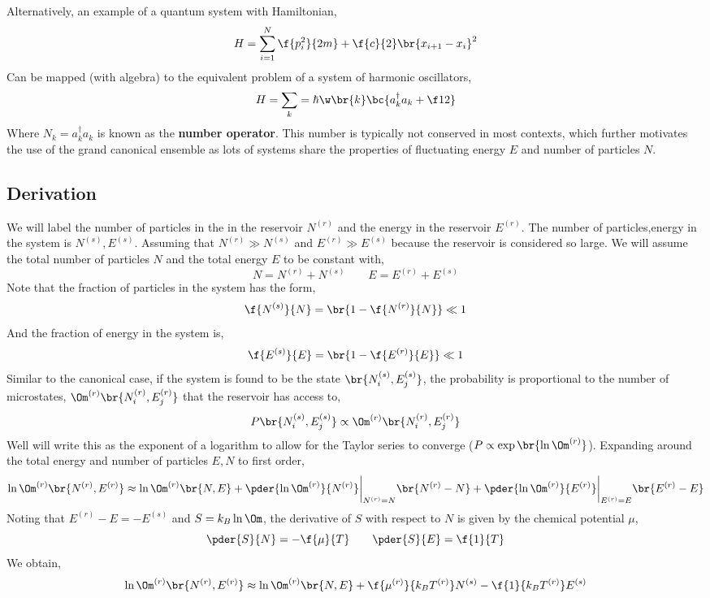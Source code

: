 \documentclass{article}
\begin{document}
{Alternatively, an example of a quantum system with Hamiltonian,
\[ H = \sum_{i = 1}^{N} \f{p_i^2}{2m} + \f{c}{2} \br{x_{i+1} - x_i}^2 \]
Can be mapped (with algebra) to the equivalent problem of a system of harmonic oscillators,
\[ H = \sum_k = \hbar \w\br{k} \bc{ a_k^\dagger a_k + \f12} \]
Where $N_k = a_k^\dagger a_k$ is known as the \textbf{number operator}. This number is typically not conserved in most contexts, which further motivates the use of the grand canonical ensemble as lots of systems share the properties of fluctuating energy $E$ and number of particles $N$.

\subsection{Derivation}

We will label the number of particles in the in the reservoir $N^{(r)}$ and the energy in the reservoir $E^{(r)}$. The number of particles,energy in the system is $N^{(s)}, E^{(s)}$. Assuming that $N^{(r)} \gg N^{(s)}$ and $E^{(r)} \gg E^{(s)}$ because the reservoir is considered so large. We will assume the total number of particles $N$ and the total energy $E$ to be constant with,
\[ N = N^{(r)} + N^{(s)} \qquad E = E^{(r)} + E^{(s)} \]
Note that the fraction of particles in the system has the form,
\[  \f{N^{(s)}}{N} = \br{1 - \f{N^{(r)}}{N}} \ll 1 \]
And the fraction of energy in the system is,
\[  \f{E^{(s)}}{E} = \br{1 - \f{E^{(r)}}{E}} \ll 1 \]
Similar to the canonical case, if the system is found to be the state $\br{N^{(s)}_i,E^{(s)}_j}$, the probability is proportional to the number of microstates, $\Om^{(r)}\br{N^{(r)}_i,E^{(r)}_j}$ that the reservoir has access to,
\[  P\br{N^{(s)}_i,E^{(s)}_j} \propto \Om^{(r)}\br{N^{(r)}_i,E^{(r)}_j} \]
Well will write this as the exponent of a logarithm to allow for the Taylor series to converge ($P \propto \exp \br{\ln \Om^{(r)}}$). Expanding around the total energy and number of particles $E,N$ to first order,
\[ \ln \Om^{(r)} \br{N^{(r)},E^{(r)}} \approx \ln \Om^{(r)} \br{N,E} + \pder{\ln \Om^{(r)}}{N^{(r)}} \bigg\rvert_{N^{(r)} = N} \br{N^{(r)} - N} + \pder{\ln \Om^{(r)}}{E^{(r)}} \bigg\rvert_{E^{(r)} = E} \br{E^{(r)} - E} \]
Noting that $E^{(r)} - E = - E^{(s)}$ and $S = k_B \ln \Om$, the derivative of $S$ with respect to $N$ is given by the chemical potential $\mu$,
\[ \pder{S}{N} = - \f{\mu}{T} \qquad \pder{S}{E} = \f{1}{T} \]
We obtain,
\[ \ln \Om^{(r)} \br{N^{(r)},E^{(r)}} \approx \ln \Om^{(r)} \br{N,E} + \f{\mu^{(r)}}{k_B T^{(r)}} N^{(s)} - \f{1}{k_B T^{(r)}} E^{(s)} \]
}
\end{document}
